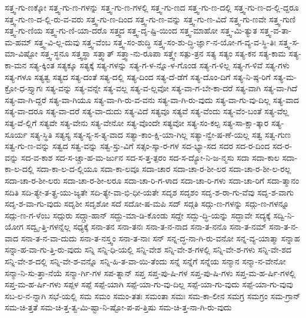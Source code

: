 {ಸತ್ತ್ವ-ಗು-ಣಕ್ಕೋ
ಸತ್ತ್ವ-ಗು-ಣ-ಗಳನ್ನು
ಸತ್ತ್ವ-ಗು-ಣ-ಗಳಲ್ಲಿ
ಸತ್ತ್ವ-ಗು-ಣದ
ಸತ್ತ್ವ-ಗು-ಣ-ದಲ್ಲಿ
ಸತ್ತ್ವ-ಗು-ಣ-ದ-ಲ್ಲಿ-ದ್ದರೂ
ಸತ್ತ್ವ-ಗು-ಣ-ದ-ಲ್ಲಿ-ರು-ವ-ವರು
ಸತ್ತ್ವ-ಗು-ಣ-ದಿಂದ
ಸತ್ತ್ವ-ಗು-ಣ-ವನ್ನು
ಸತ್ತ್ವ-ಗು-ಣ-ವಿದೆ
ಸತ್ತ್ವ-ಗು-ಣವೇ
ಸತ್ತ್ವ-ಗುಣಿ
ಸತ್ತ್ವ-ಗು-ಣಿಯ
ಸತ್ತ್ವ-ಗು-ಣಿ-ಯಾ-ದರೊ
ಸತ್ತ್ವದ
ಸತ್ತ್ವ-ದೃ-ಷ್ಟಿ-ಯಿಂದ
ಸತ್ತ್ವ-ಮಾಹೋ
ಸತ್ತ್ವ-ಮಿ-ತ್ಯುತ
ಸತ್ತ್ವ-ವ-ತಾ-ಮ-ಹಮ್
ಸತ್ತ್ವ-ವಿ-ಲ್ಲ-ದುವು
ಸತ್ತ್ವ-ವೆಂಬ
ಸತ್ತ್ವ-ಸಂ-ಶುದ್ಧಿ
ಸತ್ತ್ವ-ಸಂ-ಶು-ದ್ಧಿ-ರ್ಜ್ಞಾ-ನ-ಯೋ-ಗ-ವ್ಯ-ವ-ಸ್ಥಿ-ತಿಃ
ಸತ್ತ್ವ-ಸ-ಮಾ-ವಿಷ್ಟೋ
ಸತ್ತ್ವ-ಸ್ಥನೂ
ಸತ್ತ್ವಸ್ಥಾ
ಸತ್ತ್ವಾತ್
ಸತ್ತ್ವಾ-ನು-ರೂಪಾ
ಸತ್ತ್ವೇ
ಸತ್ಪು-ತ್ರನ
ಸತ್ಯ
ಸತ್ಯಂ
ಸತ್ಯ-ಕನ
ಸತ್ಯ-ಕಾಮ
ಸತ್ಯ-ಕಾ-ಮನ
ಸತ್ಯ-ಕ್ಕಿಂತ
ಸತ್ಯಕ್ಕೂ
ಸತ್ಯಕ್ಕೆ
ಸತ್ಯ-ಗಳನ್ನು
ಸತ್ಯ-ಗ-ಳ-ನ್ನೊ-ಳ-ಗೊಂಡ
ಸತ್ಯ-ಗ-ಳಿಲ್ಲ
ಸತ್ಯ-ಗ-ಳಿವೆ
ಸತ್ಯ-ಗಳು
ಸತ್ಯ-ಗಳೂ
ಸತ್ಯತ್ವ
ಸತ್ಯದ
ಸತ್ಯ-ದಂತೆ
ಸತ್ಯ-ದಲ್ಲಿ
ಸತ್ಯ-ದಿಂದ
ಸತ್ಯ-ದೆ-ಡೆಗೆ
ಸತ್ಯ-ದೊಂ-ದಿಗೆ
ಸತ್ಯ-ನಿ-ಷ್ಠ-ರಿಗೆ
ಸತ್ಯ-ಮ-ಕ್ರೋ-ಧ-ಸ್ತ್ಯಾಗಃ
ಸತ್ಯ-ವನ್ನು
ಸತ್ಯ-ವನ್ನೇ
ಸತ್ಯ-ವಲ್ಲ
ಸತ್ಯ-ವ-ಲ್ಲವೋ
ಸತ್ಯ-ವಾ-ಗ-ಬೇ-ಕಾ-ದರೆ
ಸತ್ಯ-ವಾಗಿ
ಸತ್ಯ-ವಾ-ಗಿದೆ
ಸತ್ಯ-ವಾ-ಗಿ-ದ್ದರೆ
ಸತ್ಯ-ವಾ-ಗಿಯೂ
ಸತ್ಯ-ವಾ-ಗಿ-ರು-ವ-ವನು
ಸತ್ಯ-ವಾ-ಗಿ-ರು-ವುದು
ಸತ್ಯ-ವಾ-ಗು-ವು-ದಿಲ್ಲ
ಸತ್ಯ-ವಾದ
ಸತ್ಯ-ವಾ-ದರೂ
ಸತ್ಯ-ವಾ-ದರೆ
ಸತ್ಯ-ವಾ-ದುದು
ಸತ್ಯ-ವಿದೆ
ಸತ್ಯವೂ
ಸತ್ಯವೆ
ಸತ್ಯ-ವೆಂದು
ಸತ್ಯ-ವೆಂ-ಬಂತೆ
ಸತ್ಯ-ವೆಲ್ಲ
ಸತ್ಯ-ವೆ-ಲ್ಲಿಗೆ
ಸತ್ಯವೇ
ಸತ್ಯ-ವೇನು
ಸತ್ಯ-ವೇನೋ
ಸತ್ಯ-ವೊಂದೇ
ಸತ್ಯವೋ
ಸತ್ಯ-ಸಂ-ಕಲ್ಪ
ಸತ್ಯ-ಸಾ-ಕ್ಷಾ-ತ್ಕಾರ
ಸತ್ಯ-ಸೂರ್ಯ
ಸತ್ಯ-ಸ್ಥಿತಿ
ಸತ್ಯಸ್ಯ
ಸತ್ಯ-ಸ್ಯ-ಸ-ತ್ಯ-ವಾದ
ಸತ್ಯಾ-ಕಾಂ-ಕ್ಷಿ-ಯಾ-ಗಿಲ್ಲ
ಸತ್ಯಾ-ನ್ವೇ-ಷ-ಣೆ-ಯಲ್ಲ
ಸತ್ವ
ಸತ್ವ-ಗುಣ
ಸತ್ವ-ಗು-ಣ-ವನ್ನು
ಸತ್ವದ
ಸತ್ವ-ವನ್ನು
ಸತ್ವ-ಸ್ತು-ವಿಗೆ
ಸತ್ಸಂ-ಸ್ಕಾ-ರ-ಗಳ
ಸದ-ಭ್ಯಾ-ಸದ
ಸದರ
ಸದ-ರ-ದಿಂದ
ಸದ-ರ-ವನ್ನು
ಸದ-ವ-ಕಾಶ
ಸದ-ಸ-ಚ್ಚಾ-ಹ-ಮ-ರ್ಜುನ
ಸದ-ಸ-ತ್ತ-ತ್ಪರಂ
ಸದ-ಸ-ದ್ಯೋ-ನಿ-ಜ-ನ್ಮಸು
ಸದಾ
ಸದಾ-ಕಾಲ
ಸದಾ-ಕಾ-ಲ-ದಲ್ಲಿ
ಸದಾ-ಕಾ-ಲ-ದ-ಲ್ಲಿಯೂ
ಸದಾ-ಕಾ-ಲವೂ
ಸದಾ-ಚಾರ
ಸದಾ-ಚಾ-ರ-ಶೀ-ಲರ
ಸದಾ-ಚಾ-ರ-ಶೀ-ಲ-ರಲ್ಲ
ಸದಾ-ಚಾ-ರ-ಶೀ-ಲರು
ಸದಾ-ಚಾ-ರ-ಶೀ-ಲರೂ
ಸದಾ-ಚಾ-ರಿ-ಗ-ಳಾದ
ಸದಾ-ಚಾ-ರಿ-ಗಳು
ಸದಾ-ಚಾ-ರಿಗೆ
ಸದಾ-ತ್ಮಾನಂ
ಸದಿತಿ
ಸದಿ-ತ್ಯೇ-ತ-ತ್ಪ್ರ-ಯು-ಜ್ಯತೇ
ಸದಿ-ತ್ಯೇ-ವಾ-ಭಿ-ಧೀ-ಯತೇ
ಸದೃಶ
ಸದೃಶಂ
ಸದೃ-ಶ-ರಾ-ಗು-ವೆವು
ಸದೃ-ಶ-ವಾಗು
ಸದೃ-ಶ-ವಾ-ಗು-ವುದು
ಸದೃಶೀ
ಸದೃಶೋ
ಸದೆ
ಸದೋ-ಷ-ಮಪಿ
ಸದ್
ಸದ್ಗತಿ
ಸದ್ಗು-ಣ-ಗಳನ್ನು
ಸದ್ಗು-ಣ-ಗಳನ್ನೂ
ಸದ್ಗು-ಣ-ಗ-ಳೆಂಬ
ಸದ್ಗುರು
ಸದ್ಗ್ರಾ-ಹಾನ್
ಸದ್ದು-ಮಾ-ಡಿ-ಕೊಂಡು
ಸದ್ದೇ
ಸದ್ಬು-ದ್ಧಿ-ಯನ್ನು
ಸದ್ಭಾವೇ
ಸದ್ಯಕ್ಕೆ
ಸದ್ವಿ-ನಿ-ಯೋಗ
ಸದ್ವೃ-ತ್ತಿ-ಗಳನ್ನೆಲ್ಲ
ಸಧ್ಯಕ್ಕೆ
ಸನಾ-ತನ
ಸನಾ-ತನಃ
ಸನಾ-ತ-ನ-ನಾದ
ಸನಾ-ತ-ನನೊ
ಸನಾ-ತ-ನಮ್
ಸನಾ-ತ-ನ-ವಾದ
ಸನಾ-ತ-ನ-ವಾ-ದುದು
ಸನಾ-ತ-ನಸ್ತ್ವಂ
ಸನಾ-ತ-ನಾಃ
ಸನ್
ಸನ್ನ-ದ್ಧ-ನಾ-ಗಿ-ರು-ವನೋ
ಸನ್ನ-ವ್ಯ-ಯಾತ್ಮಾ
ಸನ್ನಾಹ
ಸನ್ನಾ-ಹ-ವಾ-ಗು-ತ್ತಿ-ರು-ವುದು
ಸನ್ನಿ
ಸನ್ನಿ-ಧಿ-ಯಲ್ಲಿ
ಸನ್ನಿ-ವೇಶ
ಸನ್ನಿ-ವೇ-ಶ-ಗಳಲ್ಲಿ
ಸನ್ನಿ-ವೇ-ಶ-ಗಳು
ಸನ್ನಿ-ವೇ-ಶದ
ಸನ್ನಿ-ವೇ-ಶ-ದಲ್ಲಿ
ಸನ್ನಿ-ವೇ-ಶ-ವನ್ನೊ
ಸನ್ನಿ-ಹಿ-ತ-ವಾ-ಯಿ-ತೆಂದು
ಸನ್ನೆ
ಸನ್ನೆಗೆ
ಸನ್ನೆಯ
ಸನ್ಮಾನ
ಸನ್ಮಾ-ನ-ವೇನೋ
ಸನ್ಮಾ-ನಿ-ಸು-ತ್ತಾ-ನೆಯೆ
ಸನ್ಮಾ-ರ್ಗಿ-ಗಳ
ಸಪ-ತ್ನಾನ್
ಸಪ್ತ
ಸಪ್ತ-ಪು-ಷಿ-ಗಳ
ಸಪ್ತ-ಪು-ಷಿ-ಗಳು
ಸಪ್ತ-ಮ-ಹ-ರ್ಷಿ-ಗಳಲ್ಲಿ
ಸಪ್ತ-ಮ-ಹ-ರ್ಷಿ-ಗಳು
ಸಪ್ಪಳ
ಸಪ್ಪೆ
ಸಪ್ಪೆ-ಯಾಗಿ
ಸಪ್ಪೆ-ಯಾ-ಗು-ವು-ದಿಲ್ಲ
ಸಪ್ಪೆ-ಯಾ-ಗು-ವುದು
ಸಪ್ಪೆ-ಯಾ-ಗು-ವುವು
ಸಬ-ಲ-ನ-ನ್ನಾಗಿ
ಸಭೆ-ಯಲ್ಲಿ
ಸಮ
ಸಮಂ
ಸಮಂ-ತತಃ
ಸಮಂತಾ
ಸಮಃ
ಸಮ-ಕಾ-ಲೀನ
ಸಮಗ್ರ
ಸಮಗ್ರಂ
ಸಮ-ಗ್ರಾನ್
ಸಮ-ಚಿ-ತ್ತತೆ
ಸಮ-ಚಿ-ತ್ತ-ತ್ವ-ಮಿ-ಷ್ಟಾ-ನಿ-ಷ್ಟೋ-ಪ-ಪ-ತ್ತಿಷು
ಸಮ-ಚಿ-ತ್ತ-ನಾ-ಗಿ-ರು-ವುದು
}
